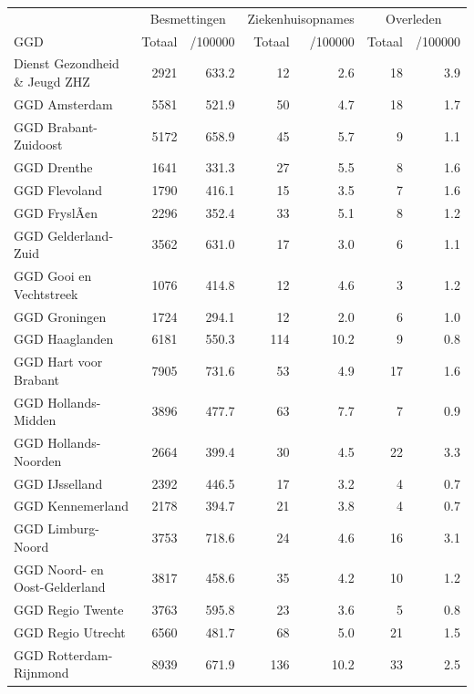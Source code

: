 \documentclass[
  english,
  man,floatsintext]{apa6}
\begin{document}
\begin{table}
\centering\begingroup\fontsize{10}{12}\selectfont

\begin{threeparttable}
\begin{tabular}{lrrrrrr}
\toprule
\multicolumn{1}{c}{ } & \multicolumn{2}{c}{Besmettingen} & \multicolumn{2}{c}{Ziekenhuisopnames} & \multicolumn{2}{c}{Overleden} \\
\cmidrule(l{3pt}r{3pt}){2-3} \cmidrule(l{3pt}r{3pt}){4-5} \cmidrule(l{3pt}r{3pt}){6-7}
GGD & Totaal & /100000 & Totaal & /100000 & Totaal & /100000\\
\midrule
Dienst Gezondheid \& Jeugd ZHZ & 2921 & 633.2 & 12 & 2.6 & 18 & 3.9\\
GGD Amsterdam & 5581 & 521.9 & 50 & 4.7 & 18 & 1.7\\
GGD Brabant-Zuidoost & 5172 & 658.9 & 45 & 5.7 & 9 & 1.1\\
GGD Drenthe & 1641 & 331.3 & 27 & 5.5 & 8 & 1.6\\
GGD Flevoland & 1790 & 416.1 & 15 & 3.5 & 7 & 1.6\\
GGD FryslÃ¢n & 2296 & 352.4 & 33 & 5.1 & 8 & 1.2\\
GGD Gelderland-Zuid & 3562 & 631.0 & 17 & 3.0 & 6 & 1.1\\
GGD Gooi en Vechtstreek & 1076 & 414.8 & 12 & 4.6 & 3 & 1.2\\
GGD Groningen & 1724 & 294.1 & 12 & 2.0 & 6 & 1.0\\
GGD Haaglanden & 6181 & 550.3 & 114 & 10.2 & 9 & 0.8\\
GGD Hart voor Brabant & 7905 & 731.6 & 53 & 4.9 & 17 & 1.6\\
GGD Hollands-Midden & 3896 & 477.7 & 63 & 7.7 & 7 & 0.9\\
GGD Hollands-Noorden & 2664 & 399.4 & 30 & 4.5 & 22 & 3.3\\
GGD IJsselland & 2392 & 446.5 & 17 & 3.2 & 4 & 0.7\\
GGD Kennemerland & 2178 & 394.7 & 21 & 3.8 & 4 & 0.7\\
GGD Limburg-Noord & 3753 & 718.6 & 24 & 4.6 & 16 & 3.1\\
GGD Noord- en Oost-Gelderland & 3817 & 458.6 & 35 & 4.2 & 10 & 1.2\\
GGD Regio Twente & 3763 & 595.8 & 23 & 3.6 & 5 & 0.8\\
GGD Regio Utrecht & 6560 & 481.7 & 68 & 5.0 & 21 & 1.5\\
GGD Rotterdam-Rijnmond & 8939 & 671.9 & 136 & 10.2 & 33 & 2.5\\

\end{tabular}
\end{threeparttable}
\end{table}
\end{document}
